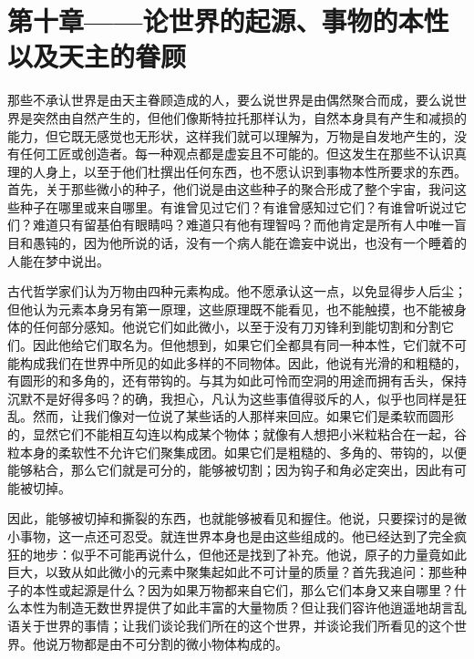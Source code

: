 
\section{第十章——论世界的起源、事物的本性以及天主的眷顾}

那些不承认世界是由天主眷顾造成的人，要么说世界是由偶然聚合而成，要么说世界是突然由自然产生的，但他们像斯特拉托那样认为，自然本身具有产生和减损的能力，但它既无感觉也无形状，这样我们就可以理解为，万物是自发地产生的，没有任何工匠或创造者。每一种观点都是虚妄且不可能的。但这发生在那些不认识真理的人身上，以至于他们杜撰出任何东西，也不愿认识到事物本性所要求的东西。首先，关于那些微小的种子，他们说是由这些种子的聚合形成了整个宇宙，我问这些种子在哪里或来自哪里。有谁曾见过它们？有谁曾感知过它们？有谁曾听说过它们？难道只有留基伯有眼睛吗？难道只有他有理智吗？而他肯定是所有人中唯一盲目和愚钝的，因为他所说的话，没有一个病人能在谵妄中说出，也没有一个睡着的人能在梦中说出。\par

古代哲学家们认为万物由四种元素构成。他不愿承认这一点，以免显得步人后尘；但他认为元素本身另有第一原理，这些原理既不能看见，也不能触摸，也不能被身体的任何部分感知。他说它们如此微小，以至于没有刀刃锋利到能切割和分割它们。因此他给它们取名为。但他想到，如果它们全都具有同一种本性，它们就不可能构成我们在世界中所见的如此多样的不同物体。因此，他说有光滑的和粗糙的，有圆形的和多角的，还有带钩的。与其为如此可怜而空洞的用途而拥有舌头，保持沉默不是好得多吗？的确，我担心，凡认为这些事值得驳斥的人，似乎也同样是狂乱。然而，让我们像对一位说了某些话的人那样来回应。如果它们是柔软而圆形的，显然它们不能相互勾连以构成某个物体；就像有人想把小米粒粘合在一起，谷粒本身的柔软性不允许它们聚集成团。如果它们是粗糙的、多角的、带钩的，以便能够粘合，那么它们就是可分的，能够被切割；因为钩子和角必定突出，因此有可能被切掉。\par

因此，能够被切掉和撕裂的东西，也就能够被看见和握住。他说，只要探讨的是微小事物，这一点还可忍受。就连世界本身也是由这些组成的。他已经达到了完全疯狂的地步：似乎不可能再说什么，但他还是找到了补充。他说，原子的力量竟如此巨大，以致从如此微小的元素中聚集起如此不可计量的质量？首先我追问：那些种子的本性或起源是什么？因为如果万物都来自它们，那么它们本身又来自哪里？什么本性为制造无数世界提供了如此丰富的大量物质？但让我们容许他逍遥地胡言乱语关于世界的事情；让我们谈论我们所在的这个世界，并谈论我们所看见的这个世界。他说万物都是由不可分割的微小物体构成的。\par

